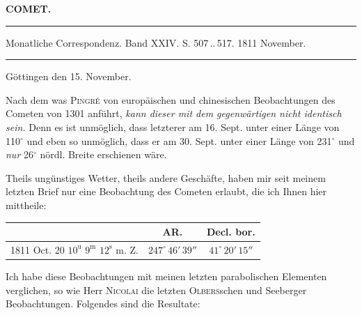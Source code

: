 \clearpage{}
\begin{center}\textbf{COMET.}\par\vspace{4pt}\hrule\vspace{4pt}\fontsize{10}{12}\selectfont Monatliche Correspondenz. Band XXIV. S. 507\,..\,517. 1811 November.\par\vspace{4pt}\hrule\vspace{4pt}\end{center}

\begin{flushright}Göttingen den 15. November.\end{flushright}
\par\indent Nach dem was \textsc{Pingré} von europäischen und chinesischen Beobachtungen des Cometen von 1301 anführt, \emph{kann dieser mit dem gegenwärtigen nicht identisch sein.} Denn es ist unmöglich, dass letzterer am 16. Sept. unter einer Länge von 110$^\circ$ und eben so unmöglich, dass er am 30. Sept. unter einer Länge von 231$^\circ$ und \emph{nur} 26$^\circ$ nördl. Breite erschienen wäre.


\par\indent Theils ungünstiges Wetter, theils andere Geschäfte, haben mir seit meinem letzten Brief nur eine Beobachtung des Cometen erlaubt, die ich Ihnen hier mittheile:

\begin{center}
\fontsize{10}{12}\selectfont\setlength{\tabcolsep}{3pt}\renewcommand{\arraystretch}{1.15}\begin{tabular}{l|c|c}
 & AR. & Decl. bor. \\ \hline
1811 Oct. 20 $10^{\mathrm u}$ $9^{\mathrm m}$ $12^{\mathrm s}$ m. Z. & $247^\circ\,46'\,39''$ & $41^\circ\,20'\,15''$ \\
\end{tabular}
\end{center}


\par\indent Ich habe diese Beobachtungen mit meinen letzten parabolischen Elementen verglichen, so wie Herr \textsc{Nicolai} die letzten \textsc{Olbers}schen und Seeberger Beobachtungen. Folgendes sind die Resultate:

